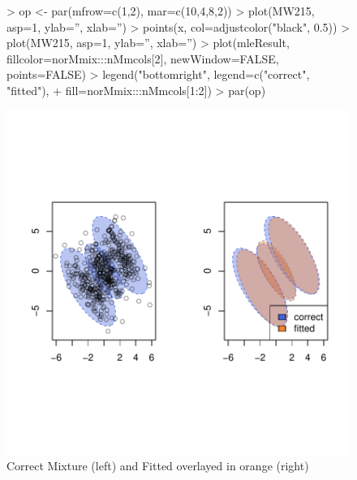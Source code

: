 \begin{figure}[h]
    \centering
\begin{Schunk}
\begin{Sinput}
>     op <- par(mfrow=c(1,2), mar=c(10,4,8,2))
>     plot(MW215, asp=1, ylab='', xlab='')
>     points(x, col=adjustcolor("black", 0.5))
>     plot(MW215, asp=1, ylab='', xlab='')
>     plot(mleResult, fillcolor=norMmix:::nMmcols[2], newWindow=FALSE, points=FALSE)
>     legend("bottomright", legend=c("correct", "fitted"),
+            fill=norMmix:::nMmcols[1:2])
>     par(op)
\end{Sinput}
\end{Schunk}
\includegraphics{chapter2-testtt}
    \caption{Correct Mixture (left) and Fitted overlayed in orange (right)}
    \label{fig:democorfit}

\end{figure}
